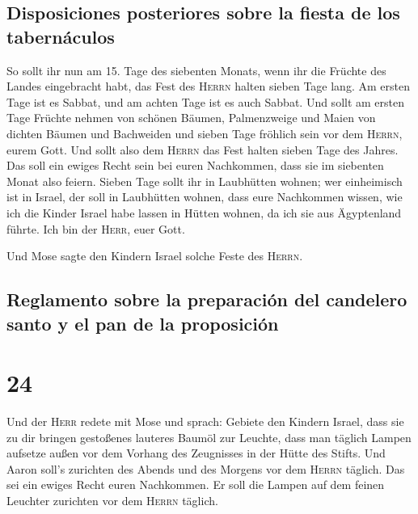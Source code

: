 \hypertarget{disposiciones-posteriores-sobre-la-fiesta-de-los-tabernuxe1culos}{%
\subsection{Disposiciones posteriores sobre la fiesta de los
tabernáculos}\label{disposiciones-posteriores-sobre-la-fiesta-de-los-tabernuxe1culos}}

 So sollt ihr nun am 15. Tage des siebenten Monats, wenn
ihr die Früchte des Landes eingebracht habt, das Fest des \textsc{Herrn}
halten sieben Tage lang. Am ersten Tage ist es Sabbat, und am achten
Tage ist es auch Sabbat.  Und sollt am ersten Tage
Früchte nehmen von schönen Bäumen, Palmenzweige und Maien von dichten
Bäumen und Bachweiden und sieben Tage fröhlich sein vor dem
\textsc{Herrn}, eurem Gott.  Und sollt also dem
\textsc{Herrn} das Fest halten sieben Tage des Jahres. Das soll ein
ewiges Recht sein bei euren Nachkommen, dass sie im siebenten Monat also
feiern.  Sieben Tage sollt ihr in Laubhütten wohnen; wer
einheimisch ist in Israel, der soll in Laubhütten wohnen,
 dass eure Nachkommen wissen, wie ich die Kinder Israel
habe lassen in Hütten wohnen, da ich sie aus Ägyptenland führte. Ich bin
der \textsc{Herr}, euer Gott.

 Und Mose sagte den Kindern Israel solche Feste des
\textsc{Herrn}.

\hypertarget{reglamento-sobre-la-preparaciuxf3n-del-candelero-santo-y-el-pan-de-la-proposiciuxf3n}{%
\subsection{Reglamento sobre la preparación del candelero santo y el pan
de la
proposición}\label{reglamento-sobre-la-preparaciuxf3n-del-candelero-santo-y-el-pan-de-la-proposiciuxf3n}}

\hypertarget{section-23}{%
\section{24}\label{section-23}}

 Und der \textsc{Herr} redete mit Mose und sprach:
 Gebiete den Kindern Israel, dass sie zu dir bringen
gestoßenes lauteres Baumöl zur Leuchte, dass man täglich Lampen aufsetze
 außen vor dem Vorhang des Zeugnisses in der Hütte des
Stifts. Und Aaron soll's zurichten des Abends und des Morgens vor dem
\textsc{Herrn} täglich. Das sei ein ewiges Recht euren Nachkommen.
 Er soll die Lampen auf dem feinen Leuchter zurichten vor
dem \textsc{Herrn} täglich.

